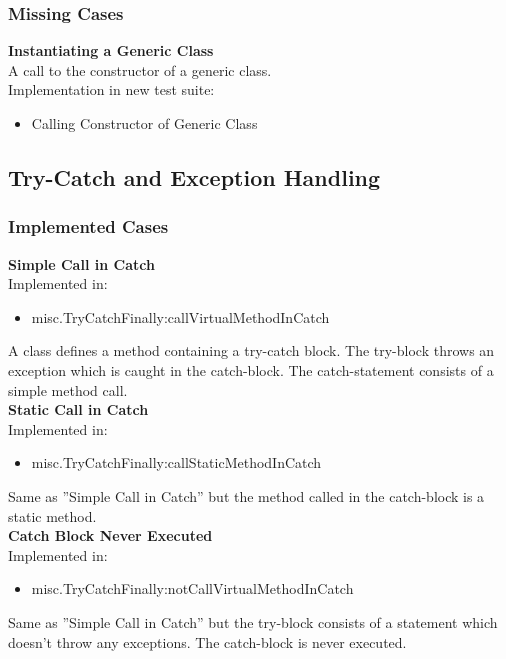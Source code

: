 \documentclass{article}
\begin{document}
\subsubsection{Missing Cases}

\textbf{Instantiating a Generic Class}\\
A call to the constructor of a generic class.\\
Implementation in new test suite: 
\begin{itemize}
    \item Calling Constructor of Generic Class
\end{itemize}

\subsection{Try-Catch and Exception Handling}
\subsubsection{Implemented Cases}

\textbf{Simple Call in Catch}\\
Implemented in: 
\begin{itemize}
    \item misc.TryCatchFinally:callVirtualMethodInCatch
\end{itemize}
A class defines a method containing a try-catch block. The try-block throws an exception which is caught in the catch-block. The catch-statement consists of a simple method call.\\

\noindent
\textbf{Static Call in Catch}\\
Implemented in: 
\begin{itemize}
    \item misc.TryCatchFinally:callStaticMethodInCatch
\end{itemize}
Same as ''Simple Call in Catch'' but the method called in the catch-block is a static method.\\

\noindent
\textbf{Catch Block Never Executed}\\
Implemented in: 
\begin{itemize}
    \item misc.TryCatchFinally:notCallVirtualMethodInCatch
\end{itemize}
Same as ''Simple Call in Catch'' but the try-block consists of a statement which doesn't throw any exceptions. The catch-block is never executed.\\
\end{document}
